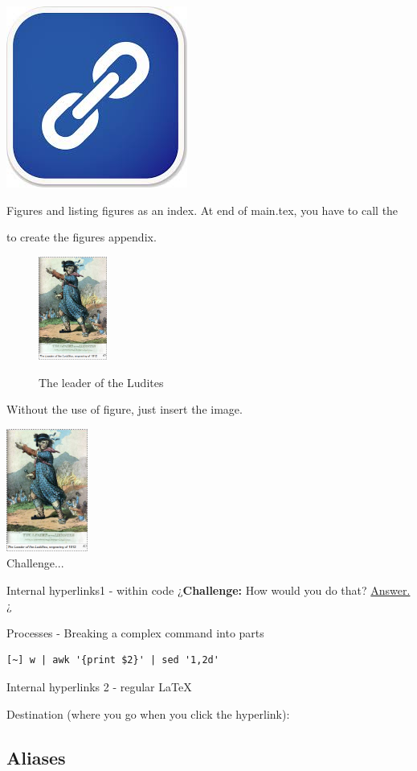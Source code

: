 \includegraphics[width=.6cm]{figures/internalhyperlink}

Figures and listing figures as an index. At end of main.tex, you have to call the \listoffigures to create the figures appendix.

\begin{figure}[!h]
\centering
\href{https://en.wikipedia.org/wiki/Luddite}{\includegraphics[width=0.2\textwidth]{figures/ludite_leader}}
\caption{The leader of the Ludites}
\label{title_page_1_ludites}
\end{figure}

Without the use of {figure}, just insert the image.

\href{https://en.wikipedia.org/wiki/Luddite}{\includegraphics[width=0.2\textwidth]{figures/ludite_leader}}\\[1cm]

Challenge...

Internal hyperlinks1 - within code
¿\textbf{\color{red}Challenge:} How would you do that? \hyperlink{sedel}{Answer.}¿

\hypertarget{sedel}{Processes - Breaking a complex command into parts}

\begin{verbatim}
[~] w | awk '{print $2}' | sed '1,2d'
\end{verbatim}

Internal hyperlinks 2 - regular LaTeX

Destination (where you go when you click the hyperlink): \subsection{Aliases}\label{subsec:aliases}

